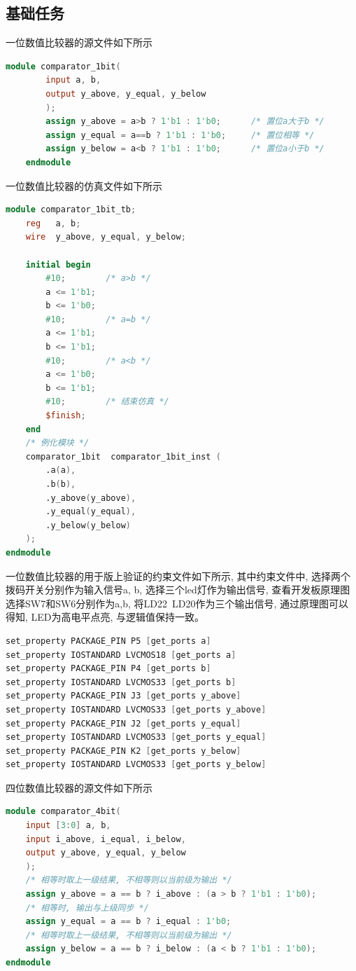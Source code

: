 \documentclass{article}
\begin{document}
\subsection*{基础任务}
一位数值比较器的源文件如下所示\\
\begin{lstlisting}[language=Verilog, caption={一位数值比较器源文件}]
    module comparator_1bit(
        input a, b,
        output y_above, y_equal, y_below
        );
        assign y_above = a>b ? 1'b1 : 1'b0;      /* 置位a大于b */
        assign y_equal = a==b ? 1'b1 : 1'b0;     /* 置位相等 */
        assign y_below = a<b ? 1'b1 : 1'b0;      /* 置位a小于b */
    endmodule
\end{lstlisting}
一位数值比较器的仿真文件如下所示\\
\begin{lstlisting}[language=Verilog, caption={一位数值比较器测试平台}]
    module comparator_1bit_tb;
    reg   a, b;
    wire  y_above, y_equal, y_below;

    initial begin
        #10;        /* a>b */
        a <= 1'b1;
        b <= 1'b0;
        #10;        /* a=b */
        a <= 1'b1;
        b <= 1'b1;
        #10;        /* a<b */
        a <= 1'b0;
        b <= 1'b1;
        #10;        /* 结束仿真 */
        $finish;
    end
    /* 例化模块 */
    comparator_1bit  comparator_1bit_inst (
        .a(a),
        .b(b),
        .y_above(y_above),
        .y_equal(y_equal),
        .y_below(y_below)
    );
endmodule
\end{lstlisting}
一位数值比较器的用于版上验证的约束文件如下所示, 其中约束文件中, 选择两个拨码开关分别作为输入信号a, b,
选择三个led灯作为输出信号, 查看开发板原理图选择SW7和SW6分别作为a,b, 将LD22~LD20作为三个输出信号, 通过原理图可以得知, LED为高电平点亮, 与逻辑值保持一致。\\
\begin{lstlisting}[language=Verilog, caption={一位数值比较器约束文件}]
set_property PACKAGE_PIN P5 [get_ports a]
set_property IOSTANDARD LVCMOS18 [get_ports a]
set_property PACKAGE_PIN P4 [get_ports b]
set_property IOSTANDARD LVCMOS33 [get_ports b]
set_property PACKAGE_PIN J3 [get_ports y_above]
set_property IOSTANDARD LVCMOS33 [get_ports y_above]
set_property PACKAGE_PIN J2 [get_ports y_equal]
set_property IOSTANDARD LVCMOS33 [get_ports y_equal]
set_property PACKAGE_PIN K2 [get_ports y_below]
set_property IOSTANDARD LVCMOS33 [get_ports y_below]
\end{lstlisting}
四位数值比较器的源文件如下所示\\
\begin{lstlisting}[language=Verilog, caption={四位数值比较器源文件}]
module comparator_4bit(
    input [3:0] a, b,
    input i_above, i_equal, i_below,
    output y_above, y_equal, y_below
    );
    /* 相等时取上一级结果, 不相等则以当前级为输出 */
    assign y_above = a == b ? i_above : (a > b ? 1'b1 : 1'b0);
    /* 相等时, 输出与上级同步 */
    assign y_equal = a == b ? i_equal : 1'b0;
    /* 相等时取上一级结果, 不相等则以当前级为输出 */          
    assign y_below = a == b ? i_below : (a < b ? 1'b1 : 1'b0);
endmodule
\end{lstlisting}
\end{document}
